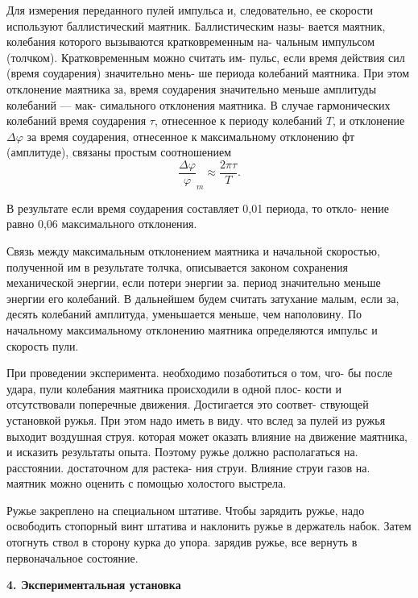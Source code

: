 \documentclass[a4paper,12pt]{article} %
\begin{document}
Для измерения переданного пулей импульса и, следовательно, ее
скорости используют баллистический маятник. Баллистическим назы-
вается маятник, колебания которого вызываются кратковременным на-
чальным импульсом (толчком). Кратковременным можно считать им-
пульс, если время действия сил (время соударения) значительно мень-
ше периода колебаний маятника. При этом отклонение маятника за,
время соударения значительно меньше амплитуды колебаний — мак-
симального отклонения маятника. В случае гармонических колебаний
время соударения $\tau$, отнесенное к периоду колебаний $T$, и отклонение
$\Delta \varphi$ за время соударения, отнесенное к максимальному отклонению фт
(амплитуде), связаны простым соотношением \[ \frac{\Delta\varphi}{\varphi}_{m} \approx \frac{2\pi \tau}{T}.\]

В результате если время соударения составляет 0,01 периода, то откло-
нение равно 0,06 максимального отклонения.

Связь между максимальным отклонением маятника и начальной скоростью, полученной им в результате толчка, описывается законом сохранения механической энергии, если потери энергии за. период значительно меньше энергии его колебаний. В дальнейшем будем считать затухание малым, если за, десять колебаний амплитуда, уменьшается меньше, чем наполовину. По начальному максимальному отклонению
маятника определяются импульс и скорость пули.

При проведении эксперимента. необходимо позаботиться о том, чго-
бы после удара, пули колебания маятника происходили в одной плос-
кости и отсутствовали поперечные движения. Достигается это соответ-
ствующей установкой ружья. При этом надо иметь в виду. что вслед
за пулей из ружья выходит воздушная струя. которая может оказать
влияние на движение маятника, и исказить результаты опыта. Поэтому
ружье должно располагаться на. расстоянии. достаточном для растека-
ния струи. Влияние струи газов на. маятник можно оценить с помощью
холостого выстрела.

Ружье закреплено на специальном штативе. Чтобы зарядить ружье, надо освободить стопорный винт штатива и наклонить ружье в держатель набок. Затем отогнуть ствол в сторону курка до упора. зарядив ружье, все вернуть в первоначальное состояние.
\newpage
\begin{center}
{\bf 4. Экспериментальная установка}
\end{center}
\end{document}
